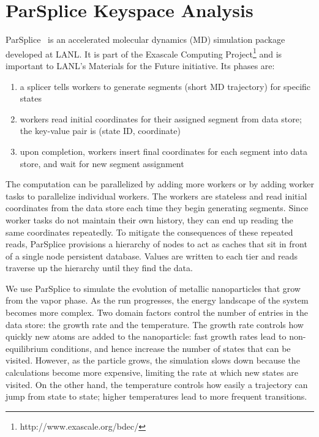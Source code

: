 \section{ParSplice Keyspace Analysis}
\label{sec:parsplice-keyspace-analysis}

ParSplice~\cite{perez:jctc20150parsplice} is an accelerated molecular dynamics
(MD) simulation package developed at LANL. It is part of the Exascale Computing
Project\footnote{http://www.exascale.org/bdec/} and is important to LANL's
Materials for the Future initiative. Its phases are:

\begin{enumerate}

  \item a splicer tells workers to generate segments (short MD trajectory) for
  specific states

  \item workers read initial coordinates for their assigned segment from data
  store; the key-value pair is (state ID, coordinate)

  \item upon completion, workers insert final coordinates for each segment into
  data store, and wait for new segment assignment

\end{enumerate}

The computation can be parallelized by adding more workers or by adding worker
tasks to parallelize individual workers.  The workers are stateless and read
initial coordinates from the data store each time they begin generating
segments. Since worker tasks do not maintain their own history, they can end up
reading the same coordinates repeatedly. To mitigate the consequences of these
repeated reads, ParSplice provisions a hierarchy of nodes to act as caches that
sit in front of a single node persistent database.  Values are written to each
tier and reads traverse up the hierarchy until they find the data. 

We use ParSplice to simulate the evolution of metallic nanoparticles that grow
from the vapor phase. As the run progresses, the energy landscape of the system
becomes more complex. Two domain factors control the number of entries in the
data store: the growth rate and the temperature. The growth rate controls how
quickly new atoms are added to the nanoparticle: fast growth rates lead to
non-equilibrium conditions, and hence increase the number of states that can be
visited. However, as the particle grows, the simulation slows down because the
calculations become more expensive, limiting the rate at which new states are
visited. On the other hand, the temperature controls how easily a trajectory
can jump from state to state; higher temperatures lead to more frequent
transitions.

